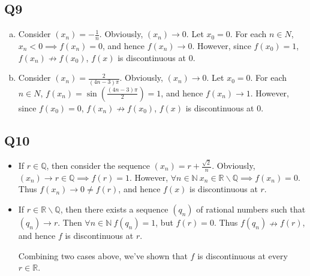 \documentclass[12pt,lettersize]{article}
\newcommand{\R}{\mathbb{R}}
\newcommand{\Q}{\mathbb{Q}}
\newcommand{\N}{\mathbb{N}}
\begin{document}
	\subsection*{Q9}
	\begin{enumerate}[(a)]
		\item Consider $(x_n)=-\frac{1}{n}$. Obviously, $(x_n)\rightarrow0$. Let $x_0=0$. For each $n\in N$, $x_n<0\implies f(x_n)=0$, and hence $f(x_n)\rightarrow0$. However, since $f(x_0)=1$, $f(x_n)\nrightarrow f(x_0)$, $f(x)$ is discontinuous at $0$.
		\item Consider $(x_n)=\frac{2}{(4n-3)\pi}$. Obviously, $(x_n)\rightarrow0$. Let $x_0=0$. For each $n\in N$, $f(x_n)=\sin(\frac{(4n-3)\pi}{2})=1$, and hence $f(x_n)\rightarrow1$. However, since $f(x_0)=0$, $f(x_n)\nrightarrow f(x_0)$, $f(x)$ is discontinuous at $0$.
	\end{enumerate}
	\newpage
	
	\subsection*{Q10}
	\begin{itemize}
		\item If $r\in\Q$, then consider the sequence $(x_n)=r+\frac{\sqrt{2}}{n}$. Obviously, $(x_n)\rightarrow r\in\Q\implies f(r)=1$. However, $\forall n\in\N\ x_n\in\R\backslash\Q\implies f(x_n)=0$. Thus $f(x_n)\rightarrow 0\neq f(r)$, and hence $f(x)$ is discontinuous at $r$.
		\item If $r\in\R\backslash\Q$, then there exists a sequence $(q_n)$ of rational numbers such that $(q_n)\rightarrow r$. Then $\forall n\in\N\ f(q_n)=1$, but $f(r)=0$. Thus $f(q_n)\nrightarrow f(r)$, and hence $f$ is discontinuous at $r$.\smallskip
		
		Combining two cases above, we've shown that $f$ is discontinuous at every $r\in\R$.
	\end{itemize}
	\newpage
	
\end{document}
